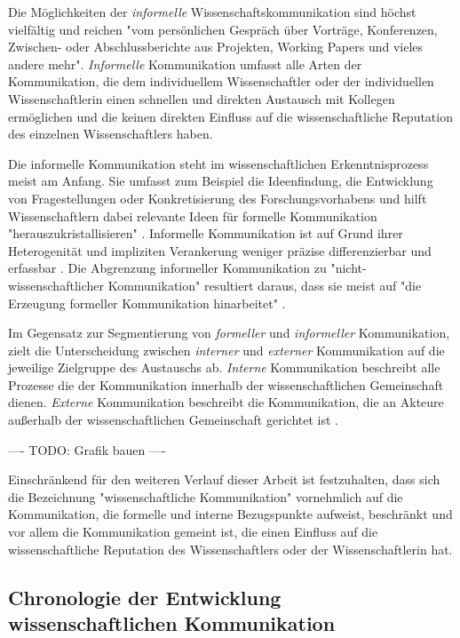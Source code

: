 Die Möglichkeiten der \textit{informelle} Wissenschaftskommunikation sind höchst vielfältig und reichen "vom persönlichen Gespräch über Vorträge, Konferenzen, Zwischen- oder Abschlussberichte aus Projekten, Working Papers und vieles andere mehr"\cite{Hanekop_2014}. \textit{Informelle} Kommunikation umfasst alle Arten der Kommunikation, die dem individuellem Wissenschaftler oder der individuellen Wissenschaftlerin einen schnellen und direkten Austausch mit Kollegen ermöglichen und die keinen direkten Einfluss auf die wissenschaftliche Reputation des einzelnen Wissenschaftlers haben.

Die informelle Kommunikation steht im wissenschaftlichen Erkenntnisprozess meist am Anfang. Sie umfasst zum Beispiel die Ideenfindung, die Entwicklung von Fragestellungen oder Konkretisierung des Forschungsvorhabens und hilft Wissenschaftlern dabei relevante Ideen für formelle Kommunikation "herauszukristallisieren" \cite{Hanekop_2014}. Informelle Kommunikation ist auf Grund ihrer Heterogenität und impliziten Verankerung weniger präzise differenzierbar und erfassbar \cite{kaden_2009_library}. Die Abgrenzung informeller Kommunikation zu "nicht-wissenschaftlicher Kommunikation" resultiert daraus, dass sie meist auf "die Erzeugung formeller Kommunikation hinarbeitet" \cite{kaden_2009_library}.

Im Gegensatz zur Segmentierung von \textit{formeller} und \textit{informeller} Kommunikation, zielt die Unterscheidung zwischen \textit{interner} und \textit{externer} Kommunikation auf die jeweilige Zielgruppe des Austauschs ab. \textit{Interne} Kommunikation beschreibt alle Prozesse die der Kommunikation innerhalb der wissenschaftlichen Gemeinschaft dienen. \textit{Externe} Kommunikation beschreibt die Kommunikation, die an Akteure außerhalb der wissenschaftlichen Gemeinschaft gerichtet ist \cite{Konneker_2013}.

---- TODO: Grafik bauen ----

Einschränkend für den weiteren Verlauf dieser Arbeit ist festzuhalten, dass sich die Bezeichnung "wissenschaftliche Kommunikation" vornehmlich auf die Kommunikation, die formelle und interne Bezugspunkte aufweist, beschränkt und vor allem die Kommunikation gemeint ist, die einen Einfluss auf die wissenschaftliche Reputation des Wissenschaftlers oder der Wissenschaftlerin hat.

\subsection{Chronologie der Entwicklung wissenschaftlichen Kommunikation}

